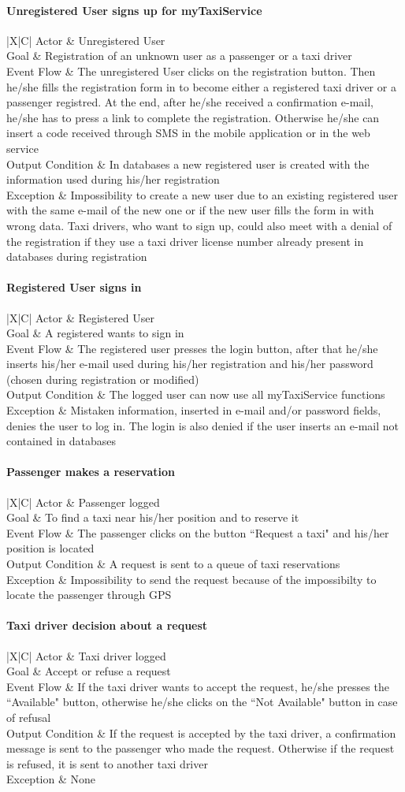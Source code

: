 \documentclass[a4paper,12pt]{article}%
\newcounter{func_req_counter}
\newcommand{\usecasetable}[5]{
\begin{center}
\begin{tabularx}{\textwidth}{|X|C|}
\hline
Actor & #1\\
\hline
Goal & #2\\
\hline
Event Flow & #3\\
\hline
Output Condition & #4\\
\hline
Exception & #5\\
\hline
\end{tabularx}
\end{center}
}
\begin{document}
\paragraph{Unregistered User signs up for myTaxiService}
\usecasetable {Unregistered User} {Registration of an unknown user as a passenger or a taxi driver} {The unregistered User clicks on the registration button. Then he/she fills the registration form in to become either a registered taxi driver or a passenger registred. At the end, after he/she received a confirmation e-mail, he/she has to press a link to complete the registration. Otherwise he/she can insert a code received through SMS in the mobile application or in the web service} {In databases a new registered user is created with the information used during his/her registration} {Impossibility to create a new user due to an existing registered user with the same e-mail of the new one or if the new user fills the form in with wrong data. Taxi drivers, who want to sign up, could also meet with a denial of the registration if they use a taxi driver license number already present in databases during registration}
\paragraph{Registered User signs in}
\usecasetable {Registered User}{A registered wants to sign in}{The registered user presses the login button, after that he/she inserts his/her e-mail used during his/her registration and his/her password (chosen during registration or modified)}{The logged user can now use all myTaxiService functions}{Mistaken information, inserted in e-mail and/or password fields, denies the user to log in. The login is also denied if the user inserts an e-mail not contained in databases}
\paragraph{Passenger makes a reservation}
\usecasetable {Passenger logged}{To find a taxi near his/her position and to reserve it}{The passenger clicks on the button ``Request a taxi" and his/her position is located}{A request is sent to a queue of taxi reservations}{Impossibility to send the request because of the impossibilty to locate the passenger through GPS}
\paragraph{Taxi driver decision about a request}
\usecasetable {Taxi driver logged}{Accept or refuse a request}{If the taxi driver wants to accept the request, he/she presses the ``Available" button, otherwise he/she clicks on the ``Not Available" button in case of refusal}{If the request is accepted by the taxi driver, a confirmation message is sent to the passenger who made the request. Otherwise if the request is refused, it is sent to another taxi driver}{None}
\end{document}
